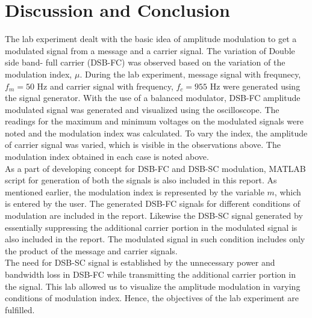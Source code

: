 \documentclass{lab_sheet}
\begin{document}
    \section{Discussion and Conclusion}
    The lab experiment dealt with the basic idea of amplitude modulation to get a modulated signal from a message and a carrier signal. The variation of Double side band- full carrier (DSB-FC) was observed based on the variation of the modulation index, $\mu$. During the lab experiment, message signal with frequnecy, $f_m=50$ Hz and carrier signal with frequency, $f_c=955$ Hz were generated using the signal generator. With the use of a balanced modulator, DSB-FC amplitude modulated signal was generated and visualized using the oscilloscope. The readings for the maximum and minimum voltages on the modulated signals were noted and the modulation index was calculated. To vary the index, the amplitude of carrier signal was varied, which is visible in the observations above. The modulation index obtained in each case is noted above. \\
    As a part of developing concept for DSB-FC and DSB-SC modulation, MATLAB script for generation of both the signals is also included in this report. As mentioned earlier, the modulation index is represented by the variable $m$, which is entered by the user. The generated DSB-FC signals for different conditions of modulation are included in the report. Likewise the DSB-SC signal generated by essentially suppressing the additional carrier portion in the modulated signal is also included in the report. The modulated signal in such condition includes only the product of the message and carrier signals.\\
    The need for DSB-SC signal is established by the unnecessary power and bandwidth loss in DSB-FC while transmitting the additional carrier portion in the signal. This lab allowed us to visualize the amplitude modulation in varying conditions of modulation index. Hence, the objectives of the lab experiment are fulfilled. 
\end{document}
